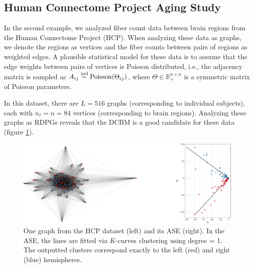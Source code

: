 \documentclass[12pt]{article}
\begin{document}
\subsection{Human Connectome Project Aging
Study}\label{human-connectome-project-aging-study}

In the second example, we analyzed fiber count data between brain
regions from the Human Connectome Project (HCP). When analyzing these
data as graphs, we denote the regions as vertices and the fiber counts
between pairs of regions as weighted edges. A plausible statistical
model for these data is to assume that the edge weights between pairs of
vertices is Poisson distributed, i.e., the adjacency matrix is sampled
as \(A_{ij} \stackrel{\mathrm{ind}}{\sim} \mathrm{Poisson}(\Theta_{ij})\), where
\(\Theta \in \mathbb{R}_+^{n \times n}\) is a symmetric matrix of
Poisson parameters.

In this dataset, there are \(L = 516\) graphs (corresponding to
individual subjects), each with \(n_\ell = n = 84\) vertices
(corresponding to brain regions). Analyzing these graphs as RDPGs
reveals that the DCBM is a good candidate for these data (figure
\ref{fig:hcp-ase}).

\begin{figure}[H]

{\centering \includegraphics[width=1\linewidth]{draft_files/figure-latex/hcp-ase-1} 

}

\caption{One graph from the HCP dataset (left) and its ASE (right). In the ASE, the lines are fitted via $K$-curves clustering using degree = 1. The outputted clusters correspond exactly to the left (red) and right (blue) hemispheres.}\label{fig:hcp-ase}
\end{figure}
\end{document}
